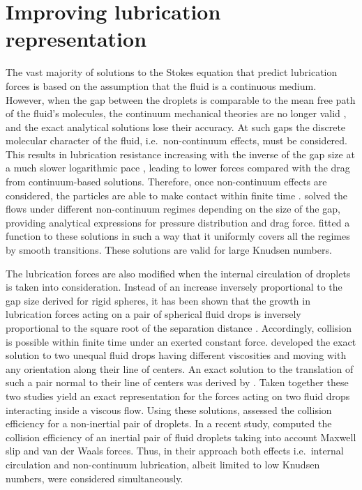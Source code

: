 \documentclass[../thesis.tex]{subfiles}
\begin{document}
\section{Improving lubrication representation\label{sec:eff}}
The vast majority of solutions to the Stokes equation that predict lubrication forces is based on the assumption that the fluid is a continuous medium. However, when the gap between the droplets is comparable to the mean free path of the fluid's molecules, the continuum mechanical theories are no longer valid \citep{SK96, CK05}, and the exact analytical solutions lose their accuracy. At such gaps the discrete molecular character of the fluid, i.e.\ non-continuum effects, must be considered. This results in lubrication resistance increasing with the inverse of the gap size at a much slower logarithmic pace \citep{D84}, leading to lower forces compared with the drag from continuum-based solutions. Therefore, once non-continuum effects are considered, the particles are able to make contact within finite time \citep{SK96,DRK21a,DRK21b}. \cite{SK96} solved the flows under different non-continuum regimes depending on the size of the gap, providing analytical expressions for pressure distribution and drag force. \cite{DRK21a} fitted a function to these solutions in such a way that it uniformly covers all the regimes by smooth transitions. These solutions are valid for large Knudsen numbers.

The lubrication forces are also modified when the internal circulation of droplets is taken into consideration. Instead of an increase inversely proportional to the gap size derived for rigid spheres, it has been shown that the growth in lubrication forces acting on a pair of spherical fluid drops is inversely proportional to the square root of the separation distance \citep{Z78,DSR89}. Accordingly, collision is possible within finite time under an exerted constant force. \cite{HHS73} developed the exact solution to two unequal fluid drops having different viscosities and moving with any orientation along their line of centers. An exact solution to the translation of such a pair normal to their line of centers was derived by \cite{Z80}. Taken together these two studies yield an exact representation for the forces acting on two fluid drops interacting inside a viscous flow. Using these solutions, \cite{Z82} assessed the collision efficiency for a non-inertial pair of droplets. In a recent study, \cite{RSD22} computed the collision efficiency of an inertial pair of fluid droplets taking into account Maxwell slip and van der Waals forces. Thus, in their approach both effects i.e.\ internal circulation and non-continuum lubrication, albeit limited to low Knudsen numbers, were considered simultaneously.
\end{document}
